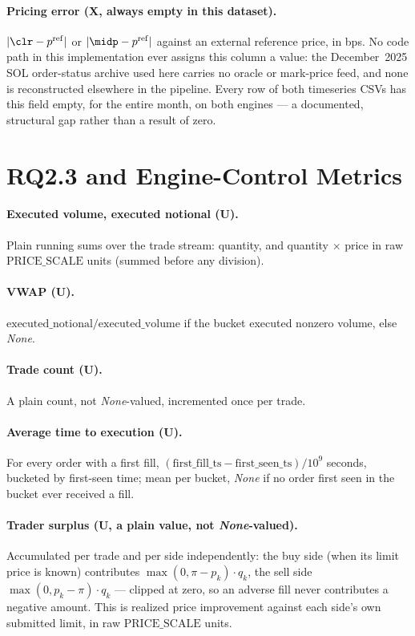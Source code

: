 \paragraph{Pricing error (X, always empty in this dataset).}
$|\clr - p^{\mathrm{ref}}|$ or $|\midp - p^{\mathrm{ref}}|$ against an
external reference price, in bps. No code path in this implementation ever
assigns this column a value: the December~2025 SOL order-status archive
used here carries no oracle or mark-price feed, and none is
reconstructed elsewhere in the pipeline. Every row of both timeseries
CSVs has this field empty, for the entire month, on both engines --- a
documented, structural gap rather than a result of zero.

\section{RQ2.3 and Engine-Control Metrics}

\paragraph{Executed volume, executed notional (U).} Plain running sums
over the trade stream: quantity, and quantity $\times$ price in raw
$\mathrm{PRICE\_SCALE}$ units (summed before any division).

\paragraph{VWAP (U).} $\mathrm{executed\_notional}/\mathrm{executed\_volume}$
if the bucket executed nonzero volume, else \emph{None}.

\paragraph{Trade count (U).} A plain count, not \emph{None}-valued,
incremented once per trade.

\paragraph{Average time to execution (U).}
For every order with a first fill, $(\text{first\_fill\_ts} -
\text{first\_seen\_ts})/10^{9}$ seconds, bucketed by first-seen time;
mean per bucket, \emph{None} if no order first seen in the bucket ever
received a fill.

\paragraph{Trader surplus (U, a plain value, not \emph{None}-valued).}
Accumulated per trade and per side independently: the buy side (when its
limit price is known) contributes $\max(0, \pi - p_k) \cdot q_k$, the
sell side $\max(0, p_k - \pi) \cdot q_k$ --- clipped at zero, so an
adverse fill never contributes a negative amount. This is realized
price improvement against each side's own submitted limit, in raw
$\mathrm{PRICE\_SCALE}$ units.

